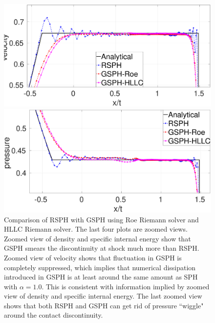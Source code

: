 \begin{figure}
\begin{minipage}{.495 \textwidth}
    \end{minipage}%
    \\
    \begin{minipage}{.495 \textwidth}
        \centering
        \includegraphics[width=0.99 \textwidth]{Chapter-4/Figures/Sod/RCM-Sod-GSPH-compare-v-zoom}
    \end{minipage}%
    \begin{minipage}{.495\textwidth}
        \centering
        \includegraphics[width=0.99 \textwidth]{Chapter-4/Figures/Sod/RCM-Sod-GSPH-compare-p-zoom}
    \end{minipage}%
    \caption{Comparison of RSPH with GSPH using Roe Riemann solver and HLLC Riemann solver. The last four plots are zoomed views. Zoomed view of density and specific internal energy show that GSPH smears the discontinuity at shock much more than RSPH. Zoomed view of velocity shows that fluctuation in GSPH is completely suppressed, which implies that numerical dissipation introduced in GSPH is at least around the same amount as SPH with $\alpha=1.0$. This is consistent with information implied by zoomed view of density and specific internal energy. The last zoomed view shows that both RSPH and GSPH can get rid of pressure ``wiggle" around the contact discontinuity.}
    \label{fig:RCM-Sod-GSPH}
\end{figure}

